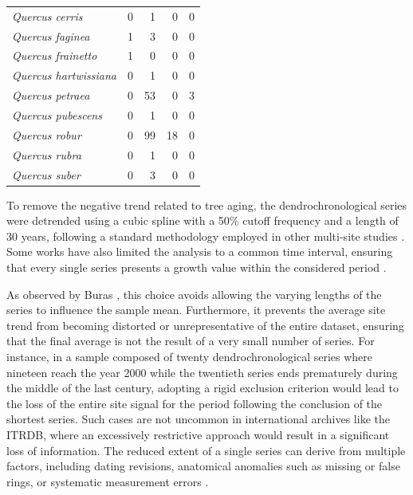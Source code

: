 \documentclass[12pt, a4paper]{article}
\begin{document}
\begin{table}[H]
\begin{tabular}{lrrrr}
  \textit{Quercus cerris}            &   0 &   1 &   0 &   0 \\ 
  \textit{Quercus faginea}           &   1 &   3 &   0 &   0 \\ 
  \textit{Quercus frainetto}         &   1 &   0 &   0 &   0 \\ 
  \textit{Quercus hartwissiana}      &   0 &   1 &   0 &   0 \\ 
  \textit{Quercus petraea}           &   0 &  53 &   0 &   3 \\ 
  \textit{Quercus pubescens}         &   0 &   1 &   0 &   0 \\ 
  \textit{Quercus robur}             &   0 &  99 &  18 &   0 \\ 
  \textit{Quercus rubra}             &   0 &   1 &   0 &   0 \\ 
  \textit{Quercus suber}             &   0 &   3 &   0 &   0 \\ 
  \bottomrule
\end{tabular}
\end{table}


To remove the negative trend related to tree aging, the dendrochronological series were detrended using a cubic spline with a 50\% cutoff frequency and a length of 30 years, following a standard methodology employed in other multi-site studies \parencite{tokarska-osyczka2025, klesse2019, bhuyan2017}. Some works have also limited the analysis to a common time interval, ensuring that every single series presents a growth value within the considered period \parencite{alzeley2023, camarero2024, vieira2021}.

As observed by Buras \parencite{buras2022}, this choice avoids allowing the varying lengths of the series to influence the sample mean. Furthermore, it prevents the average site trend from becoming distorted or unrepresentative of the entire dataset, ensuring that the final average is not the result of a very small number of series. For instance, in a sample composed of twenty dendrochronological series where nineteen reach the year 2000 while the twentieth series ends prematurely during the middle of the last century, adopting a rigid exclusion criterion would lead to the loss of the entire site signal for the period following the conclusion of the shortest series. Such cases are not uncommon in international archives like the ITRDB, where an excessively restrictive approach would result in a significant loss of information. The reduced extent of a single series can derive from multiple factors, including dating revisions, anatomical anomalies such as missing or false rings, or systematic measurement errors \parencite{speer2010}.
\end{document}
